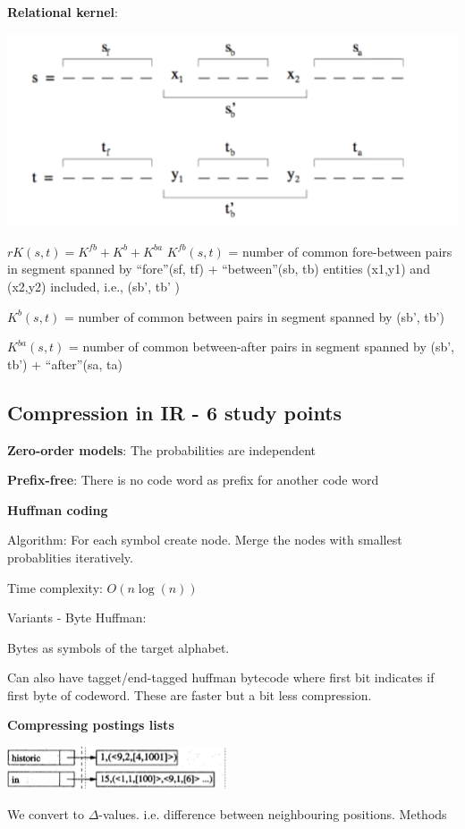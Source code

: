 \documentclass[a4paper,10pt,landscape]{article}
\newcommand{\topic}[1]{\begin{center}\section*{#1}\end{center}}
\begin{document}
\begin{multicols}{3}
 \textbf{Relational kernel}:
 
 \includegraphics[width=\linewidth]{images/relationalkernel.png}
 
 $rK(s,t) = K^{fb} +  K^b + K^{ba}$
 $K^{fb}(s,t)$ =  number of common fore-between pairs in segment spanned by “fore”(sf, tf) +  “between”(sb, tb) entities (x1,y1) and (x2,y2) included, i.e., (sb’, tb’ )
 
 $K^{b}(s,t)$ = number of common between pairs in segment spanned by (sb’, tb’) 
 
 $K^{ba}(s,t)$ = number of common between-after pairs in segment spanned by (sb’, tb’) +  “after”(sa, ta)

\topic{Compression in IR - 6 study points}

\textbf{Zero-order models}: The probabilities are independent

\textbf{Prefix-free}: There is no code word as prefix for another code word

\textbf{Huffman coding}

Algorithm:
For each symbol create node. Merge the nodes with smallest probablities iteratively.

Time complexity: $O(n\log(n))$

Variants - Byte Huffman:

Bytes as symbols of the target alphabet.

Can also have tagget/end-tagged huffman bytecode where first bit indicates if first byte of codeword. These are faster but a bit less compression.

\textbf{Compressing postings lists}

\includegraphics[width=.5\linewidth]{images/invertedfile}

We convert to $\Delta$-values. i.e. difference between neighbouring positions.
Methods


\end{multicols}
\end{document}

